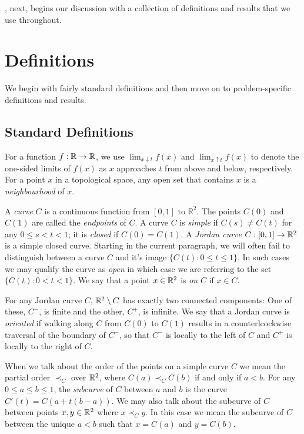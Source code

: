 \documentclass{patmorin}
\begin{document}
, next, begins our discussion with a collection of
definitions and results that we use throughout.


\section{Definitions}

We begin with fairly standard definitions and then move on to problem-specific definitions and results.

\subsection{Standard Definitions}

For a function $f:\mathbb{R}\to\mathbb{R}$, we use $\lim_{x\downarrow t} f(x)$ and
$\lim_{x\uparrow t} f(x)$ to denote the one-sided limits of $f(x)$
as $x$ approaches $t$ from above and below, respectively.  For a
point $x$ in a topological space, any open set that contains $x$ is a
\emph{neighbourhood} of $x$.  

A \emph{curve} $C$ is a continuous function from $[0,1]$
to $\mathbb{R}^2$.  The points $C(0)$ and $C(1)$ are called the
\emph{endpoints} of $C$.  A curve $C$ is \emph{simple} if $C(s)\neq C(t)$
for any $0\le s<t< 1$; it is \emph{closed} if $C(0)=C(1)$.  A \emph{Jordan
curve} $C:[0,1]\to\mathbb{R}^2$ is a simple closed curve.  Starting in the current
paragraph, we will often fail to distinguish between a curve $C$ and it's
image $\{C(t):0\le t\le 1\}$.  In such cases we may qualify the curve as
\emph{open} in which case we are referring to the set $\{C(t):0< t< 1\}$.
We say that a point $x\in\mathbb{R}^2$ is \emph{on} $C$ if $x\in C$.  

For any Jordan curve $C$, $\mathbb{R}^2\setminus C$ has exactly two connected
components: One of these, $C^-$, is finite and the other, $C^+$, is
infinite.  We say that a Jordan curve is \emph{oriented} if walking
along $C$ from $C(0)$ to $C(1)$ results in a counterlcockwise traversal
of the boundary of $C^-$, so that $C^-$ is locally to the left of $C$
and $C^+$ is locally to the right of $C$.

When we talk about the order of the points on a simple curve $C$ we
mean the partial order $\prec_C$ over $\mathbb{R}^2$, where $C(a)\prec_C C(b)$
if and only if $a<b$.  For any $0\le a\le b\le 1$, the \emph{subcurve}
of $C$ between $a$ and $b$ is the curve $C'(t)=C(a+t(b-a))$.  We may also
talk about the subcurve of $C$ between points $x,y\in\mathbb{R}^2$ where $x\prec_C
y$. In this case we mean the subcurve of $C$ between the unique $a< b$
such that $x=C(a)$ and $y=C(b)$.
\end{document}
